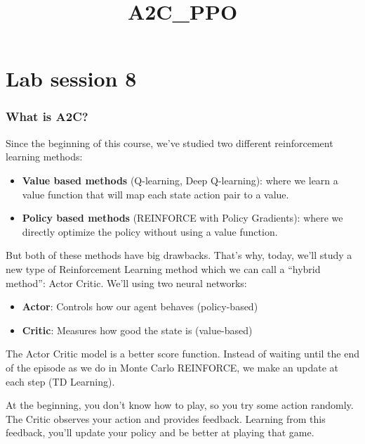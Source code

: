 \documentclass[11pt]{article}
\title{A2C\_PPO}
\providecommand{\tightlist}{%
      \setlength{\itemsep}{0pt}\setlength{\parskip}{0pt}}
\begin{document}
    
    \maketitle
    
    

    
    \hypertarget{lab-session-8}{%
\section{Lab session 8}\label{lab-session-8}}

\hypertarget{what-is-a2c}{%
\subsubsection{What is A2C?}\label{what-is-a2c}}

Since the beginning of this course, we've studied two different
reinforcement learning methods:

\begin{itemize}
\tightlist
\item
  \textbf{Value based methods} (Q-learning, Deep Q-learning): where we
  learn a value function that will map each state action pair to a
  value.
\item
  \textbf{Policy based methods} (REINFORCE with Policy Gradients): where
  we directly optimize the policy without using a value function.
\end{itemize}

But both of these methods have big drawbacks. That's why, today, we'll
study a new type of Reinforcement Learning method which we can call a
``hybrid method'': Actor Critic. We'll using two neural networks:

\begin{itemize}
\tightlist
\item
  \textbf{Actor}: Controls how our agent behaves (policy-based)
\item
  \textbf{Critic}: Measures how good the state is (value-based)
\end{itemize}

The Actor Critic model is a better score function. Instead of waiting
until the end of the episode as we do in Monte Carlo REINFORCE, we make
an update at each step (TD Learning).

At the beginning, you don't know how to play, so you try some action
randomly. The Critic observes your action and provides feedback.
Learning from this feedback, you'll update your policy and be better at
playing that game.
\end{document}
